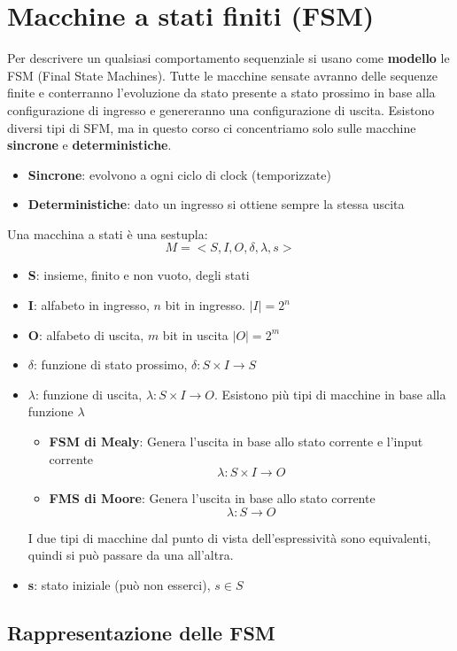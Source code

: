 \documentclass[a4paper]{article}
\theoremstyle{break}
\theoremstyle{break}
\theoremstyle{break}
\theoremstyle{break}
\begin{document}
\section{Macchine a stati finiti (FSM)} \label{sec:macchine-a-stati-finiti}
Per descrivere un qualsiasi comportamento sequenziale si usano come \textbf{modello}
le FSM (Final State Machines).
Tutte le macchine sensate avranno delle sequenze finite e conterranno l'evoluzione da
stato presente a stato prossimo in base alla configurazione di ingresso e genereranno una
configurazione di uscita. Esistono diversi tipi di SFM, ma in questo corso ci
concentriamo solo sulle macchine \textbf{sincrone} e \textbf{deterministiche}.
\begin{itemize}
  \item \textbf{Sincrone}: evolvono a ogni ciclo di clock (temporizzate) 
  \item \textbf{Deterministiche}: dato un ingresso si ottiene sempre la stessa uscita
\end{itemize}
Una macchina a stati è una sestupla: 
\[
M=<S,I,O,\delta,\lambda,s>
\] 
\begin{itemize}
  \item \textbf{S}: insieme, finito e non vuoto, degli stati
  \item \textbf{I}: alfabeto in ingresso, \( n \) bit in ingresso. \( |I|=2^n \) 
  \item \textbf{O}: alfabeto di uscita, \( m \)  bit in uscita \( |O|=2^m \)
  \item \textbf{\(\delta\)}: funzione di stato prossimo, \( \delta: S \times I \to S \)
  \item \textbf{\(\lambda\)}: funzione di uscita, \( \lambda: S \times I \to O \). Esistono
    più tipi di macchine in base alla funzione \( \lambda \) 
    \begin{itemize}
      \item \textbf{FSM di Mealy}: Genera l'uscita in base allo stato corrente e l'input corrente \[ \lambda: S \times I \to O \]
      \item \textbf{FMS di Moore}: Genera l'uscita in base allo stato corrente \[ \lambda: S \to O \]
    \end{itemize}
    I due tipi di macchine dal punto di vista dell'espressività sono equivalenti, quindi
    si può passare da una all'altra.
  \item \textbf{s}: stato iniziale (può non esserci), \( s \in S \)
\end{itemize}

\subsection{Rappresentazione delle FSM}
\end{document}
